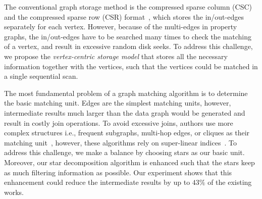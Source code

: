 The conventional graph storage method is the compressed sparse column (CSC) and the compressed sparse row (CSR) format~\cite{DBLP:conf/osdi/KyrolaBG12},
which stores the in/out-edges separately for each vertex.
However, because of the multi-edges in property graphs, the in/out-edges have to be searched many times to check the matching of a vertex, and result in excessive random disk seeks.
To address this challenge, we propose the \emph{vertex-centric storage model} that stores all the necessary information together with the vertices, such that the vertices could be matched in a single sequential scan.


The most fundamental problem of a graph matching algorithm is to determine the basic matching unit.
Edges are the simplest matching units, however, intermediate results much larger than the data graph would be generated and result in costly join operations.
To avoid excessive joins, authors use more complex structures i.e.,
frequent subgraphs, multi-hop edges, or cliques as their matching unit~\cite{DBLP:conf/sigmod/HeS08,DBLP:conf/edbt/ZhangLY09,DBLP:journals/pvldb/QiaoZC17}, however,
these algorithms rely on super-linear indices~\cite{DBLP:journals/pvldb/SunWWSL12}.
To address this challenge, we make a balance by choosing stars as our basic unit.
Moreover, our star decomposition algorithm is enhanced such that the stars keep as much filtering information as possible.
Our experiment shows that this enhancement could reduce the intermediate results by up to $43\%$ of the existing works.


